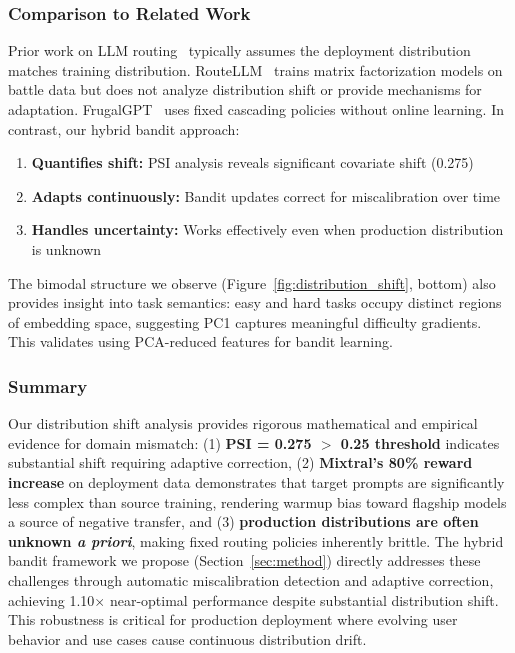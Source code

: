 \subsubsection{Comparison to Related Work}

Prior work on LLM routing~\cite{ong2024routellm,chen2024frugalgpt} typically assumes the deployment distribution matches training distribution. RouteLLM~\cite{ong2024routellm} trains matrix factorization models on battle data but does not analyze distribution shift or provide mechanisms for adaptation. FrugalGPT~\cite{chen2024frugalgpt} uses fixed cascading policies without online learning. In contrast, our hybrid bandit approach:
\begin{enumerate}[leftmargin=*,noitemsep,topsep=2pt]
    \item \textbf{Quantifies shift:} PSI analysis reveals significant covariate shift (0.275)
    \item \textbf{Adapts continuously:} Bandit updates correct for miscalibration over time
    \item \textbf{Handles uncertainty:} Works effectively even when production distribution is unknown
\end{enumerate}

\noindent The bimodal structure we observe (Figure~\ref{fig:distribution_shift}, bottom) also provides insight into task semantics: easy and hard tasks occupy distinct regions of embedding space, suggesting PC1 captures meaningful difficulty gradients. This validates using PCA-reduced features for bandit learning.

\subsubsection{Summary}

Our distribution shift analysis provides rigorous mathematical and empirical evidence for domain mismatch: (1) \textbf{PSI = 0.275 $>$ 0.25 threshold} indicates substantial shift requiring adaptive correction, (2) \textbf{Mixtral's 80\% reward increase} on deployment data demonstrates that target prompts are significantly less complex than source training, rendering warmup bias toward flagship models a source of negative transfer, and (3) \textbf{production distributions are often unknown \emph{a priori}}, making fixed routing policies inherently brittle. The hybrid bandit framework we propose (Section~\ref{sec:method}) directly addresses these challenges through automatic miscalibration detection and adaptive correction, achieving 1.10$\times$ near-optimal performance despite substantial distribution shift. This robustness is critical for production deployment where evolving user behavior and use cases cause continuous distribution drift.

